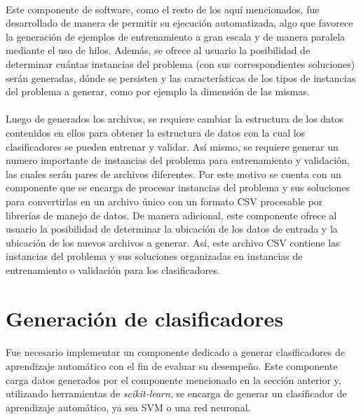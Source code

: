 \paragraph{} Este componente de software, como el resto de los aquí mencionados, fue desarrollado de manera de permitir su ejecución automatizada, algo que favorece la generación de ejemplos de entrenamiento a gran escala y de manera paralela mediante el uso de hilos. Además, se ofrece al usuario la posibilidad de determinar cuántas instancias del problema (con sus correspondientes soluciones) serán generadas, dónde se persisten y las características de los tipos de instancias del problema a generar, como por ejemplo la dimensión de las mismas.

\paragraph{} Luego de generados los archivos, se requiere cambiar la estructura de los datos contenidos en ellos para obtener la estructura de datos con la cual los clasificadores se pueden entrenar y validar. Así mismo, se requiere generar un numero importante de instancias del problema para entrenamiento y validación, las cuales serán pares de archivos diferentes. Por este motivo se cuenta con un componente que se encarga de procesar instancias del problema y sus soluciones para convertirlas en un archivo único con un formato CSV procesable por librerías de manejo de datos. De manera adicional, este componente ofrece al usuario la posibilidad de determinar la ubicación de los datos de entrada y la ubicación de los nuevos archivos a generar. Así, este archivo CSV contiene las instancias del problema y sus soluciones organizadas en instancias de entrenamiento o validación para los clasificadores.

\section{Generación de clasificadores}

\paragraph{} Fue necesario implementar un componente dedicado a generar clasificadores de aprendizaje automático con el fin de evaluar su desempeño. Este componente carga datos generados por el componente mencionado en la sección anterior y, utilizando herramientas de \textit{scikit-learn}, se encarga de generar un clasificador de aprendizaje automático, ya sea SVM o una red neuronal. 

